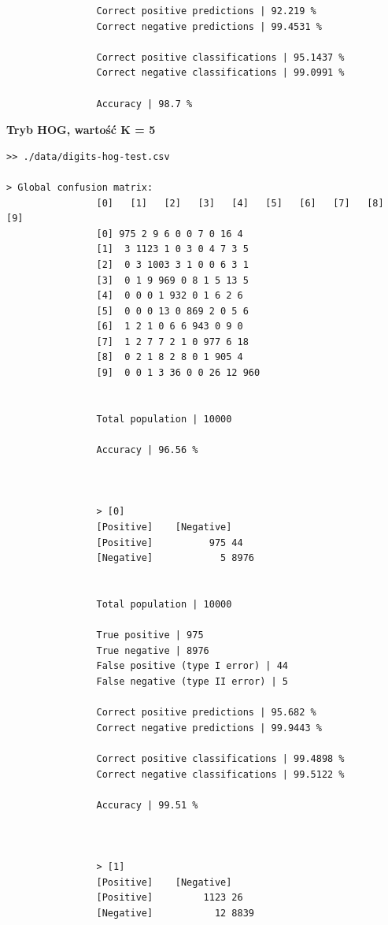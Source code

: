 \documentclass{classrep}
\begin{document}
{{{\begin{lstlisting}
                Correct positive predictions | 92.219 %
                Correct negative predictions | 99.4531 %

                Correct positive classifications | 95.1437 %
                Correct negative classifications | 99.0991 %

                Accuracy | 98.7 %

                \end{lstlisting}
                \textbf{Tryb HOG, wartość K = 5}
                \begin{lstlisting}
>> ./data/digits-hog-test.csv

> Global confusion matrix:
                [0]   [1]   [2]   [3]   [4]   [5]   [6]   [7]   [8]   [9]
                [0] 975 2 9 6 0 0 7 0 16 4
                [1]  3 1123 1 0 3 0 4 7 3 5
                [2]  0 3 1003 3 1 0 0 6 3 1
                [3]  0 1 9 969 0 8 1 5 13 5
                [4]  0 0 0 1 932 0 1 6 2 6
                [5]  0 0 0 13 0 869 2 0 5 6
                [6]  1 2 1 0 6 6 943 0 9 0
                [7]  1 2 7 7 2 1 0 977 6 18
                [8]  0 2 1 8 2 8 0 1 905 4
                [9]  0 0 1 3 36 0 0 26 12 960


                Total population | 10000

                Accuracy | 96.56 %



                > [0]
                [Positive]    [Negative]
                [Positive]          975 44
                [Negative]            5 8976


                Total population | 10000

                True positive | 975
                True negative | 8976
                False positive (type I error) | 44
                False negative (type II error) | 5

                Correct positive predictions | 95.682 %
                Correct negative predictions | 99.9443 %

                Correct positive classifications | 99.4898 %
                Correct negative classifications | 99.5122 %

                Accuracy | 99.51 %



                > [1]
                [Positive]    [Negative]
                [Positive]         1123 26
                [Negative]           12 8839



\end{lstlisting}}}}
\end{document}
